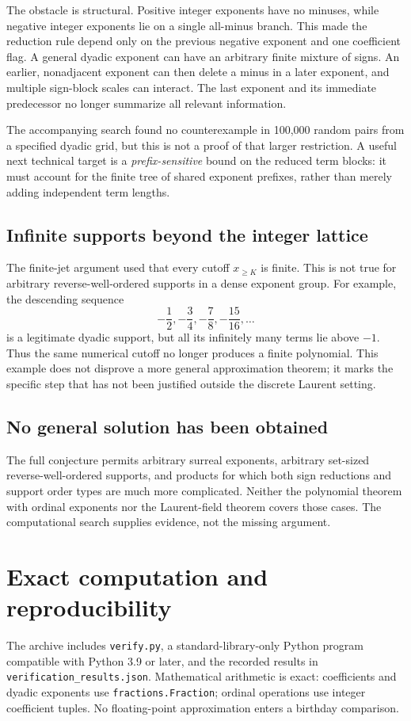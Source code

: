 \documentclass[11pt,letterpaper]{article}
\numberwithin{equation}{section}
\theoremstyle{definition}
\theoremstyle{remark}
\newcommand{\co}[1]{\texttt{#1}}
\begin{document}
The obstacle is structural. Positive integer exponents have no minuses, while
negative integer exponents lie on a single all-minus branch. This made the
reduction rule depend only on the previous negative exponent and one
coefficient flag. A general dyadic exponent can have an arbitrary finite
mixture of signs. An earlier, nonadjacent exponent can then delete a minus in
a later exponent, and multiple sign-block scales can interact. The last
exponent and its immediate predecessor no longer summarize all relevant
information.

The accompanying search found no counterexample in 100,000 random pairs from
a specified dyadic grid, but this is not a proof of that larger restriction.
A useful next technical target is a \emph{prefix-sensitive} bound on the reduced
term blocks: it must account for the finite tree of shared exponent prefixes,
rather than merely adding independent term lengths.

\subsection{Infinite supports beyond the integer lattice}
The finite-jet argument used that every cutoff $x_{\geq K}$ is finite. This is
not true for arbitrary reverse-well-ordered supports in a dense exponent group.
For example, the descending sequence
\[
 -\frac12,-\frac34,-\frac78,-\frac{15}{16},\ldots
\]
is a legitimate dyadic support, but all its infinitely many terms lie above
$-1$. Thus the same numerical cutoff no longer produces a finite polynomial.
This example does not disprove a more general approximation theorem; it marks
the specific step that has not been justified outside the discrete Laurent
setting.

\subsection{No general solution has been obtained}
The full conjecture permits arbitrary surreal exponents, arbitrary set-sized
reverse-well-ordered supports, and products for which both sign reductions and
support order types are much more complicated. Neither the polynomial theorem
with ordinal exponents nor the Laurent-field theorem covers those cases.
The computational search supplies evidence, not the missing argument.

\section{Exact computation and reproducibility}
\label{sec:computation}
The archive includes \co{verify.py}, a standard-library-only Python program
compatible with Python 3.9 or later, and the recorded results in
\co{verification\_results.json}. Mathematical arithmetic is exact: coefficients
and dyadic exponents use \co{fractions.Fraction}; ordinal operations use integer
coefficient tuples. No floating-point approximation enters a birthday comparison.
\end{document}
